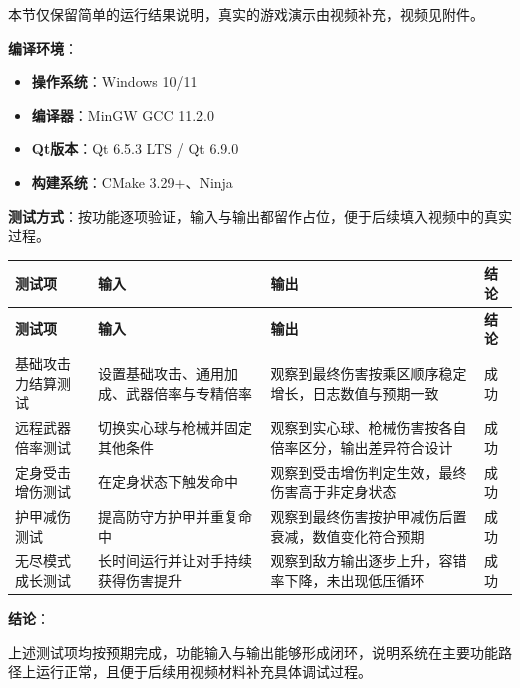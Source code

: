 ﻿\documentclass[utf8]{ctexart}
\begin{document}
本节仅保留简单的运行结果说明，真实的游戏演示由视频补充，视频见附件。

\textbf{编译环境}：

\begin{itemize}
  \item \textbf{操作系统}：Windows 10/11
  \item \textbf{编译器}：MinGW GCC 11.2.0
  \item \textbf{Qt版本}：Qt 6.5.3 LTS / Qt 6.9.0
  \item \textbf{构建系统}：CMake 3.29+、Ninja
\end{itemize}

\textbf{测试方式}：按功能逐项验证，输入与输出都留作占位，便于后续填入视频中的真实过程。

\begin{longtable}{p{}p{}p{}p{}}
\toprule
\textbf{测试项} & \textbf{输入} & \textbf{输出} & \textbf{结论} \\
\midrule
\endfirsthead
\toprule
\textbf{测试项} & \textbf{输入} & \textbf{输出} & \textbf{结论} \\
\midrule
\endhead
基础攻击力结算测试 & 设置基础攻击、通用加成、武器倍率与专精倍率 & 观察到最终伤害按乘区顺序稳定增长，日志数值与预期一致 & 成功 \\
远程武器倍率测试 & 切换实心球与枪械并固定其他条件 & 观察到实心球、枪械伤害按各自倍率区分，输出差异符合设计 & 成功 \\
定身受击增伤测试 & 在定身状态下触发命中 & 观察到受击增伤判定生效，最终伤害高于非定身状态 & 成功 \\
护甲减伤测试 & 提高防守方护甲并重复命中 & 观察到最终伤害按护甲减伤后置衰减，数值变化符合预期 & 成功 \\
无尽模式成长测试 & 长时间运行并让对手持续获得伤害提升 & 观察到敌方输出逐步上升，容错率下降，未出现低压循环 & 成功 \\
\bottomrule
\end{longtable}

\textbf{结论}：

上述测试项均按预期完成，功能输入与输出能够形成闭环，说明系统在主要功能路径上运行正常，且便于后续用视频材料补充具体调试过程。


\appendix
\end{document}

